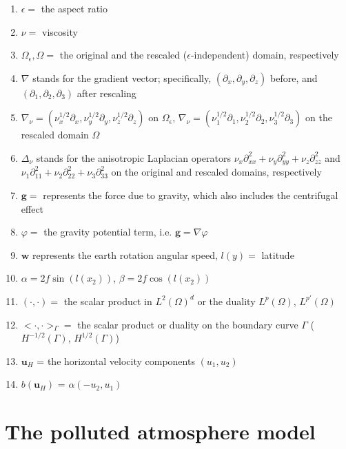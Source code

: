 \documentclass[11pt]{article}
\begin{document}
\begin{enumerate}

\item $\epsilon = $ the aspect ratio
\item $\nu = $ viscosity
\item $\Omega_\epsilon, \Omega = $ the original and the rescaled ($\epsilon$-independent) domain, respectively
\item $\nabla$ stands for the gradient vector; specifically, $(\partial_x, \partial_y, \partial_z)$ before, and $(\partial_1, \partial_2, \partial_3)$ after rescaling
\item $\nabla_\nu = (\nu_x^{1/2} \partial_x, \nu_y^{1/2} \partial_y, \nu_z^{1/2} \partial_z)$ on $\Omega_\epsilon$, $\nabla_\nu = (\nu_1^{1/2} \partial_1, \nu_2^{1/2} \partial_2, \nu_3^{1/2} \partial_3)$ on the rescaled domain $\Omega$
\item $ \Delta_\nu$ stands for the anisotropic Laplacian operators $\nu_x \partial^2_{xx} + \nu_y \partial^2_{yy}  + \nu_z \partial^2_{zz}$ and $\nu_1 \partial^2_{11} + \nu_2 \partial^2_{22}  + \nu_3 \partial^2_{33}$ on the original and rescaled domains, respectively
\item $\mathbf{g} = $ represents the force due to gravity, which also includes the centrifugal effect
\item $\varphi = $ the gravity potential term, i.e. $\mathbf{g} = \nabla \varphi$
\item $\mathbf{w}$ represents the earth rotation angular speed, $l(y) = $ latitude
\item $\alpha = 2 f \sin (l(x_2))$, $\beta = 2 f \cos (l(x_2))$
\item $( \cdot,\cdot) = $ the scalar product in $L^2(\Omega)^d$ or the duality $L^p (\Omega)$, $L^{p'} (\Omega)$
\item $< \cdot,\cdot>_{\Gamma} = $ the scalar product or duality on the boundary curve $\Gamma$ ($H^{-1/2}(\Gamma)$, $H^{1/2}(\Gamma)$)
\item $\mathbf{u}_H$ = the horizontal velocity components $(u_1, u_2)$
\item $b(\mathbf{u}_H)$ = $\alpha (-u_2 , u_1)$

\end{enumerate}

\section{The polluted atmosphere model} \label{eqsdescribingatmpluspollution}
\end{document}
